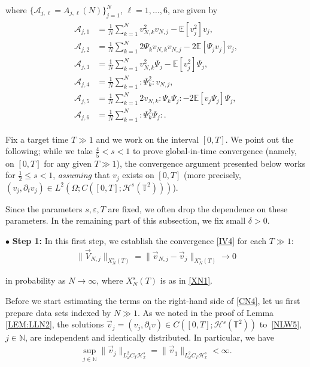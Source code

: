 \documentclass[letterpaper, 11pt,  reqno]{amsart}
\newcommand{\1}{\hspace{0.5mm}\text{I}\hspace{0.2mm}}
\newcommand{\noi}{\noindent}
\newcommand{\T}{\mathbb{T}}
\newcommand{\N}{\mathbb{N}}
\newcommand{\E}{\mathbb{E}}
\renewcommand{\H}{\mathcal{H}}
\newcommand{\eps}{\varepsilon}
\newcommand{\dl}{\delta}
\newcommand{\dt}{\partial_t}
\newcommand{\A}{\mathcal{A}}
\newcommand{\wick}[1]{:\!{#1}\!:}
\newcommand{\too}{\longrightarrow}
\renewcommand{\O}{\Omega}
\renewcommand{\o}{\omega}
\renewcommand{\l}{\ell}
\numberwithin{equation}{section}
\numberwithin{theorem}{section}
\begin{document}
\noi
where
$\{ \A_{j, \l} = A_{j, \l}(N)\}_{j = 1}^N$, $ \l = 1, \dots, 6$, are given by 
\begin{align}
\begin{split}
\A_{j, 1} & =  
\frac{1}{N} \sum_{k = 1}^N  
v_{N, k}^2 v_{N, j}
-  \E [ v_j^2 ] v_j, \\
\A_{j, 2} & =  
 \frac{1}{N} \sum_{k = 1}^N 
2 \Psi_k v_{N, k} v_{N, j}
- 2 \E [ \Psi_j v_j ] v_j ,\\
\A_{j, 3} & =   \frac{1}{N} \sum_{k = 1}^N 
v_{N, k}^2 \Psi_j - 
\E [ v_j^2 ] \Psi_j , \\
\A_{j, 4} & =   \frac{1}{N} \sum_{k = 1}^N 
\wick{\Psi_k^2} v_{N, j},  \\
\A_{j, 5} & =   \frac{1}{N} \sum_{k = 1}^N 
 2 v_{N, k} \wick{ \Psi_k \Psi_j } 
 -  2 \E [ v_j \Psi_j  ] \Psi_j, \\
\A_{j, 6} & =   \frac{1}{N} \sum_{k = 1}^N 
 \wick{\Psi_k^2 \Psi_j} .
\end{split}
\label{CN5}
\end{align}







Fix a target time $T \gg 1$
and we work on the interval $[0, T]$.
We point out the following;
while 
we take $\frac 45 < s < 1$
to prove  global-in-time convergence
(namely, on $[0, T]$ for any given $T\gg1$),
 the convergence argument presented below works for 
$\frac 12 \le s < 1$, 
{\it assuming} that 
$v_j$ exists on $[0, T]$
(more precisely, $(v_j, \dt v_j) \in 
L^2(\O;  C ([0, T]; \H^s (\T^2) ))$).


Since 
the parameters $s, \eps, T$ are fixed, we often drop the dependence
on these parameters.
In the remaining part of this subsection, 
we fix small $\dl > 0$.

\medskip

\noi
$\bullet$ {\bf Step 1:}
In this first step, we  establish the  convergence \eqref{IV4}
for each $T \gg 1$:
\begin{align}
\| \vec V_{N, j} \|_{X^s_N(T)}
= \| \vec v_{N, j}  - \vec v_j \|_{X^s_N(T)}
\too 0  
\label{CN5a}
\end{align}

\noi
in probability as $N \to \infty$, 
where $X^s_N(T)$ is as in \eqref{XN1}.








Before we start estimating the terms on the right-hand side of  \eqref{CN4}, 
let us first  prepare 
data sets indexed by $N \gg1 $. 
As we noted in the proof of Lemma \ref{LEM:LLN2}, 
the solutions $\vec v_j = (v_j, \dt v) \in C([0, T]; \H^s(\T^2))$
 to~\eqref{NLW5}, $j \in \N$,  are 
 independent 
and identically distributed.
In particular, we have 
\begin{align}
\sup_{j \in \N} 
\| \vec v_j \|_{L^2_\o C_T \H^s_x}
= 
\| \vec v_1 \|_{L^2_\o C_T \H^s_x}
 < \infty.
\label{BD1}
\end{align}
\end{document}
